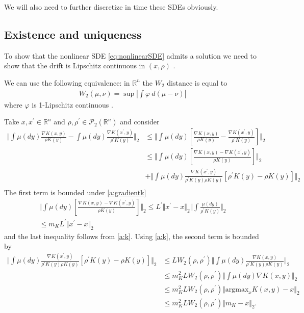 \documentclass[a4paper]{article}
\theoremstyle{definition}
\newcommand{\norm}[2]{\ensuremath{\Vert #1 \Vert_{#2}}}
\def\real{\mathbb{R}}
\def\testfn{\varphi}
\begin{document}
We will also need to further discretize in time these SDEs obviously.

\subsection{Existence and uniqueness}
To show that the nonlinear SDE \eqref{eq:nonlinearSDE} admits a solution we need to show that the drift is Lipschitz continuous in $(x, \rho)$ \citep{jourdain2007nonlinear}.

We can use the following equivalence: in $\real^n$ the $W_2$ distance is equal to
\begin{align*}
W_2(\mu, \nu) = \sup\left\lvert \int \testfn \ d(\mu - \nu)\right\rvert
\end{align*}
where $\testfn$ is 1-Lipschitz continuous \citep[page 112]{santambrogio2017euclidean}.

Take $x, x^\prime\in \real^n$  and $\rho, \rho^\prime \in \mathcal{P}_2(\real^n)$ and consider
\begin{align*}
\norm{ \int\mu\left(dy\right)\frac{\nabla K(x,y)}{\rho K(y)}- \int\mu\left(dy\right)\frac{\nabla K(x^\prime,y)}{\rho^\prime K(y)}}{2} &\leq \norm{\int\mu\left(dy\right)\left[\frac{\nabla K(x,y)}{\rho K(y)}- \frac{\nabla K(x^\prime,y)}{\rho^\prime K(y)}\right]}{2} \\
&\leq \norm{\int\mu\left(dy\right)\left[\frac{\nabla K(x,y) - \nabla K(x^\prime,y)}{\rho K(y)}\right]}{2}\\
& +\norm{\int\mu\left(dy\right)\frac{\nabla K(x^\prime,y)}{\rho^\prime K(y)\rho K(y)}\left[\rho^\prime K(y) - \rho K(y)\right]}{2}
\\
\end{align*}
The first term is bounded under \ref{a:gradientk}
\begin{align*}
\norm{\int\mu\left(dy\right)\left[\frac{\nabla K(x,y) - \nabla K(x^\prime,y)}{\rho K(y)}\right]}{2} \leq L^\prime\norm{x^\prime - x}{2}\norm{\int\frac{\mu\left(dy\right)}{\rho^\prime K(y)}}{2}\\
\leq m_K L^\prime\norm{x^\prime - x}{2}
\end{align*}
and the last inequality follows from \ref{a:k}.
Using \ref{a:k}, the second term is bounded by
\begin{align*}
\norm{\int\mu\left(dy\right)\frac{\nabla K(x^\prime,y)}{\rho^\prime K(y)\rho K(y)}\left[\rho^\prime K(y) - \rho K(y)\right]}{2} &\leq LW_2(\rho, \rho^\prime)\norm{\int\mu\left(dy\right)\frac{\nabla K(x,y)}{\rho^\prime K(y)\rho K(y)}}{2}\\
&\leq m_K^2LW_2(\rho, \rho^\prime)\norm{\int\mu\left(dy\right)\nabla K(x,y)}{2}\\
&\leq m_K^2LW_2(\rho, \rho^\prime)\norm{\text{argmax}_{x} K(x, y) - x}{2}\\
&\leq m_K^2LW_2(\rho, \rho^\prime)\norm{m_K - x}{2}.
\end{align*}
\end{document}
